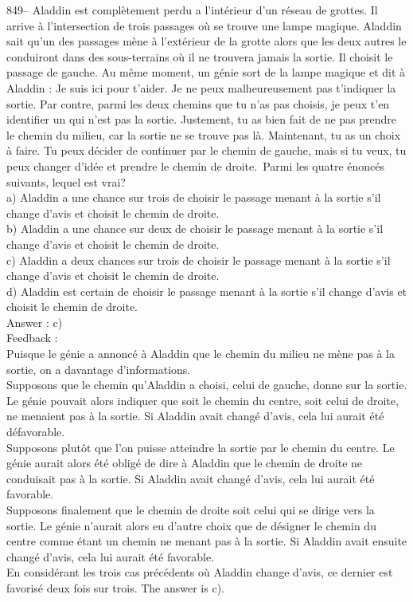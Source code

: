 ﻿\documentclass[letterpaper, 12pt]{article}
\begin{document}
849-- Aladdin est compl\`etement perdu a l'int\'erieur d'un r\'eseau
de grottes.  Il arrive \`a l'intersection de trois passages o\`u se
trouve une lampe magique.  Aladdin sait qu'un des passages m\`ene
\`a l'ext\'erieur de la grotte alors que les deux autres le
conduiront dans des sous-terrains o\`u il ne trouvera jamais la
sortie.  Il choisit le passage de gauche.  Au m\^eme moment, un
g\'enie sort de la lampe magique et dit \`a Aladdin : \og Je suis
ici pour t'aider.  Je ne peux malheureusement pas t'indiquer la
sortie.  Par contre, parmi les deux chemins que tu n'as pas choisis,
je peux t'en identifier un qui n'est pas la sortie.  Justement, tu
as bien fait de ne pas prendre le chemin du milieu, car la sortie ne
se trouve pas l\`a. Maintenant, tu as un choix \`a faire.  Tu peux
d\'ecider de continuer par le chemin de gauche, mais si tu veux, tu
peux changer d'id\'ee et prendre le chemin de droite.\fg\  Parmi les
quatre \'enonc\'es suivants, lequel est
vrai?\\
a) Aladdin a une chance sur trois de choisir le passage menant \`a la sortie
s'il change d'avis et choisit le chemin de droite. \\
b) Aladdin a une chance sur deux de choisir le passage menant \`a la sortie
s'il change d'avis et choisit le chemin de droite.\\
c) Aladdin a deux chances sur trois de choisir le passage menant \`a la
sortie s'il change d'avis et choisit le chemin de droite.\\
d) Aladdin est certain de choisir le passage menant \`a la sortie s'il
change d'avis et choisit le chemin de droite.\\

Answer : c)\\

Feedback : \\
Puisque le g\'enie a annonc\'e \`a Aladdin que le chemin du milieu ne m\`ene
pas \`a la sortie, on a davantage d'informations.\\
Supposons que le chemin qu'Aladdin a choisi, celui de gauche, donne
sur la sortie. Le g\'enie pouvait alors indiquer que soit le chemin
du centre, soit celui de droite, ne menaient pas \`a la sortie. Si
Aladdin avait chang\'e d'avis, cela lui aurait \'et\'e
d\'efavorable.\\
Supposons plut\^ot que l'on puisse atteindre la sortie par le chemin du
centre. Le g\'enie aurait alors \'et\'e oblig\'e de dire \`a Aladdin que le
chemin de droite ne conduisait pas \`a la sortie. Si Aladdin avait chang\'e
d'avis, cela lui aurait \'et\'e favorable.\\
Supposons finalement que le chemin de droite soit celui qui se dirige vers
la sortie. Le g\'enie n'aurait alors eu d'autre choix que de d\'esigner le
chemin du centre comme \'etant un chemin ne menant pas \`a la sortie. Si
Aladdin avait ensuite chang\'e d'avis, cela lui aurait \'et\'e favorable.\\
En consid\'erant les trois cas pr\'ec\'edents o\`u Aladdin change d'avis, ce
dernier est favoris\'e deux fois sur trois. The answer is c).\\
\end{document}
